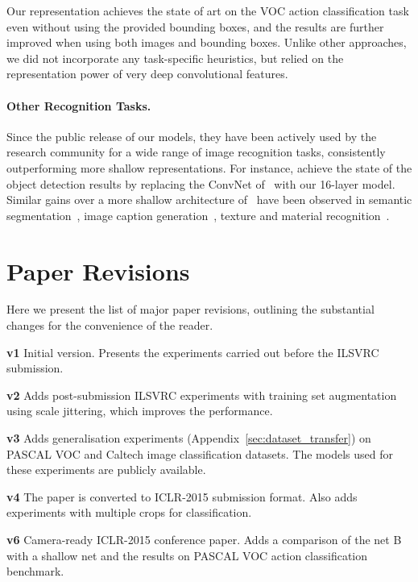 \documentclass{article} %
\newcommand{\apref}[1]{Appendix~\ref{#1}}
\begin{document}
Our representation achieves the state of art on the VOC action classification task even without using the provided bounding boxes, and the results are further improved when using both images and bounding boxes.
Unlike other approaches, we did not incorporate any task-specific heuristics, but relied on the representation power of very deep convolutional features.

\paragraph{Other Recognition Tasks.}
Since the public release of our models, they have been actively used by the research community for a wide range of image recognition tasks, consistently outperforming more shallow representations. For instance, \citet{Girshick14a} achieve the state of the object detection results by replacing the ConvNet of~\citet{Krizhevsky12} with our 16-layer model. Similar gains over a more shallow architecture of~\citet{Krizhevsky12} have been observed in semantic segmentation~\citep{Long14}, image caption generation~\citep{Kiros14,Karpathy14a}, texture and material recognition~\citep{Cimpoi14a,Bell14}.



\section{Paper Revisions}
\label{sec:revisions}
Here we present the list of major paper revisions, outlining the substantial changes for the convenience of the reader.

\textbf{v1} Initial version. Presents the experiments carried out before the ILSVRC submission.

\textbf{v2} Adds post-submission ILSVRC experiments with training set augmentation using scale jittering, which improves the performance.

\textbf{v3} Adds generalisation experiments (\apref{sec:dataset_transfer}) on PASCAL VOC and Caltech image classification datasets. The models used for these experiments are publicly available.

\textbf{v4} The paper is converted to ICLR-2015 submission format. Also adds experiments with multiple crops for classification.

\textbf{v6} Camera-ready ICLR-2015 conference paper. Adds a comparison of the net B with a shallow net and the results on PASCAL VOC action classification benchmark.
\end{document}
